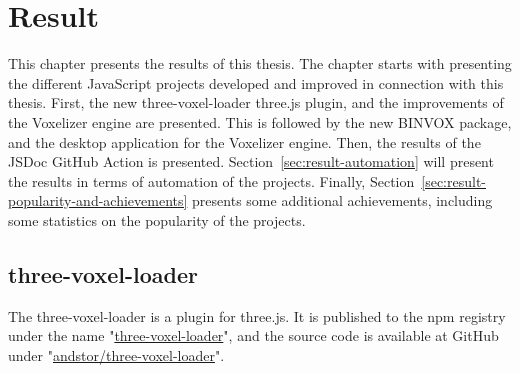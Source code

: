 \chapter{Result}
This chapter presents the results of this thesis. The chapter starts with presenting the different JavaScript projects developed and improved in connection with this thesis. First, the new three-voxel-loader three.js plugin, and the improvements of the Voxelizer engine are presented. This is followed by the new BINVOX package, and the desktop application for the Voxelizer engine. Then, the results of the JSDoc GitHub Action is presented. Section~\ref{sec:result-automation} will present the results in terms of automation of the projects. Finally, Section~\ref{sec:result-popularity-and-achievements} presents some additional achievements, including some statistics on the popularity of the projects.

\section{three-voxel-loader}
The three-voxel-loader is a plugin for three.js. It is published to the npm registry under the name "\href{https://www.npmjs.com/package/three-voxel-loader}{three-voxel-loader}", and the source code is available at GitHub under "\href{https://github.com/andstor/three-voxel-loader}{andstor/three-voxel-loader}".

